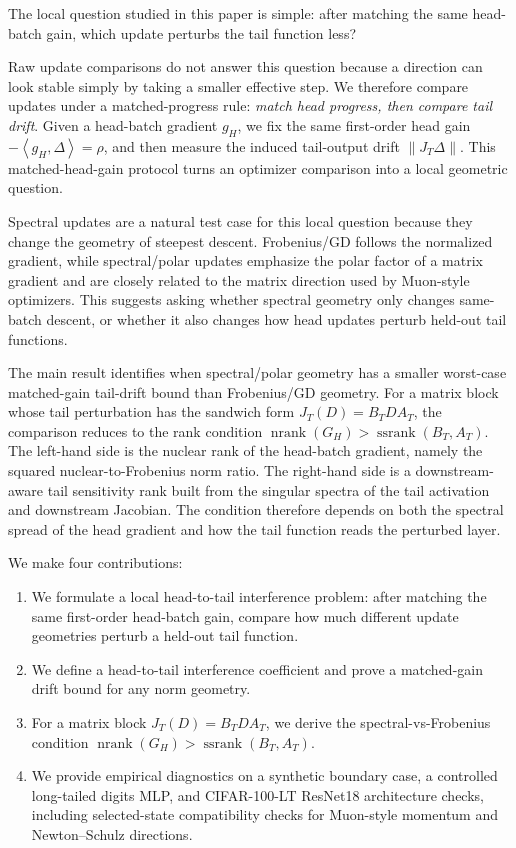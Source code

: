 \documentclass{article}
\theoremstyle{definition}
\newcommand{\norm}[1]{\left\lVert #1 \right\rVert}
\newcommand{\inner}[2]{\left\langle #1,#2 \right\rangle}
\newcommand{\nrank}{\operatorname{nrank}}
\newcommand{\ssrank}{\operatorname{ssrank}}
\begin{document}
The local question studied in this paper is simple: after matching the same head-batch gain, which update perturbs the tail function less?

Raw update comparisons do not answer this question because a direction can look stable simply by taking a smaller effective step. We therefore compare updates under a matched-progress rule: \emph{match head progress, then compare tail drift}. Given a head-batch gradient \(g_H\), we fix the same first-order head gain \(-\inner{g_H}{\Delta}=\rho\), and then measure the induced tail-output drift \(\norm{J_T\Delta}\). This matched-head-gain protocol turns an optimizer comparison into a local geometric question.

Spectral updates are a natural test case for this local question because they change the geometry of steepest descent. Frobenius/GD follows the normalized gradient, while spectral/polar updates emphasize the polar factor of a matrix gradient and are closely related to the matrix direction used by Muon-style optimizers. This suggests asking whether spectral geometry only changes same-batch descent, or whether it also changes how head updates perturb held-out tail functions.

The main result identifies when spectral/polar geometry has a smaller worst-case matched-gain tail-drift bound than Frobenius/GD geometry. For a matrix block whose tail perturbation has the sandwich form \(J_T(D)=B_TDA_T\), the comparison reduces to the rank condition \(\nrank(G_H)>\ssrank(B_T,A_T)\). The left-hand side is the nuclear rank of the head-batch gradient, namely the squared nuclear-to-Frobenius norm ratio. The right-hand side is a downstream-aware tail sensitivity rank built from the singular spectra of the tail activation and downstream Jacobian. The condition therefore depends on both the spectral spread of the head gradient and how the tail function reads the perturbed layer.

We make four contributions:
\begin{enumerate}
  \item We formulate a local head-to-tail interference problem: after matching the same first-order head-batch gain, compare how much different update geometries perturb a held-out tail function.
  \item We define a head-to-tail interference coefficient and prove a matched-gain drift bound for any norm geometry.
  \item For a matrix block \(J_T(D)=B_TDA_T\), we derive the spectral-vs-Frobenius condition \(\nrank(G_H)>\ssrank(B_T,A_T)\).
  \item We provide empirical diagnostics on a synthetic boundary case, a controlled long-tailed digits MLP, and CIFAR-100-LT ResNet18 architecture checks, including selected-state compatibility checks for Muon-style momentum and Newton--Schulz directions.
\end{enumerate}
\end{document}
